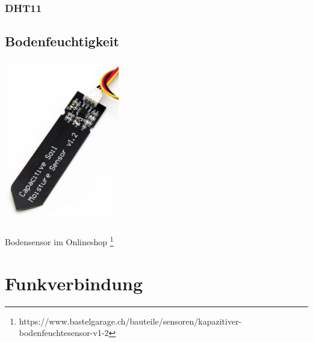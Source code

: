 \documentclass[
  10pt, %
  a4paper, %
  twoside, %
  openright, %
  numbers=noenddot, %
  BCOR=5mm, %
  parskip=half*, %
  thesis, %
]{bfhbook}
\begin{document}
\subsubsection{DHT11}
\subsection{Bodenfeuchtigkeit}

\begin{center}
\includegraphics[width=5cm, left]{Bilder/Soil-2.jpg}%
\label{labelname}%
\end{center}
Bodensensor im Onlineshop \footnote{https://www.bastelgarage.ch/bauteile/sensoren/kapazitiver-bodenfeuchtesensor-v1-2}

 \section{Funkverbindung}
 
\end{document}
